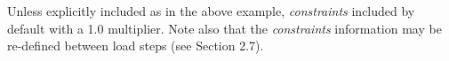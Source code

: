 \documentclass[11pt]{report}
\numberwithin{equation}{section}
\newcommand{\noi}{\noindent}
\newcommand{\ti}{\emph}
\begin{document}
\noi Unless explicitly included as in the above example, \ti{constraints}
included by default with a 1.0 multiplier. Note also that the \ti{constraints}
information may be re-defined between load steps (see Section 2.7).


           
%
%


\end{document}
